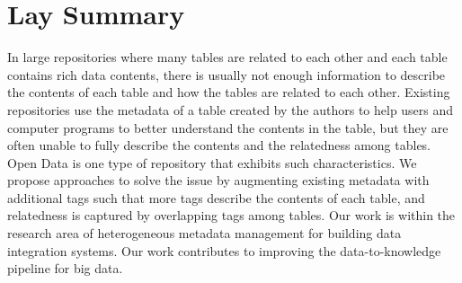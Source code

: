 

\chapter{Lay Summary}

In large repositories where many tables are related to each other and each table contains rich data contents, there is usually not enough information to describe the contents of each table and how the tables are related to each other. Existing repositories use the metadata of a table created by the authors to help users and computer programs to better understand the contents in the table, but they are often unable to fully describe the contents and the relatedness among tables. Open Data is one type of repository that exhibits such characteristics. We propose approaches to solve the issue by augmenting existing metadata with additional tags such that more tags describe the contents of each table, and relatedness is captured by overlapping tags among tables. Our work is within the research area of heterogeneous metadata management for building data integration systems. Our work contributes to improving the data-to-knowledge pipeline for big data.
\endinput